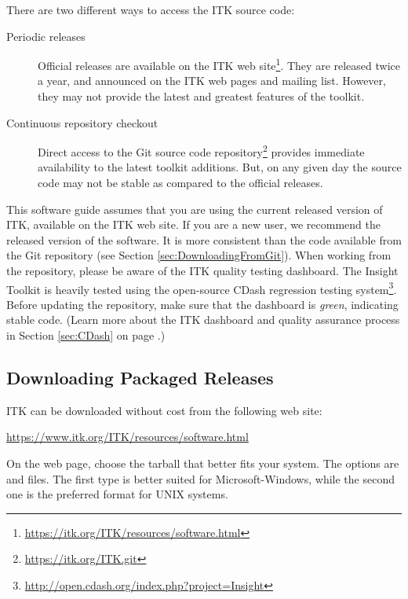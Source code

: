 There are two different ways to access the ITK source code:
\begin{description}
  \item[Periodic releases]{Official releases are available on the ITK web
    site\footnote{\url{https://itk.org/ITK/resources/software.html}}.
    They are released twice a year,
    and announced on the ITK web pages and mailing list.
    However, they may not provide the latest and greatest features of the
    toolkit.}
  \item[Continuous repository checkout]{Direct access to the Git source code
    repository\footnote{\url{https://itk.org/ITK.git}} provides immediate
    availability to the latest toolkit additions. But, on any given day the
    source code may not be stable as compared to the official releases.}
\end{description}

This software guide assumes that you are using the current released version of
ITK, available on the ITK web site. If you are a new user, we recommend the
released version of the software. It is more consistent
than the code available from the Git repository (see Section
\ref{sec:DownloadingFromGit}).  When working from the
repository, please be aware of the ITK quality testing dashboard. The Insight
Toolkit is heavily tested using the open-source CDash regression testing
system\footnote{\url{http://open.cdash.org/index.php?project=Insight}}. Before
updating the repository, make sure that the dashboard is \emph{green},
indicating stable code. (Learn more about the ITK dashboard and quality
assurance process in Section \ref{sec:CDash} on page \pageref{sec:CDash}.)

\subsection{Downloading Packaged Releases}
\label{sec:DownloadingReleases}


ITK can be downloaded without cost from the following web site:
\begin{center}
  \url{https://www.itk.org/ITK/resources/software.html}
\end{center}

On the web page, choose the tarball that better fits your system. The options are
 and  files. The first type is better suited for
Microsoft-Windows, while the second one is the preferred format for UNIX
systems.

